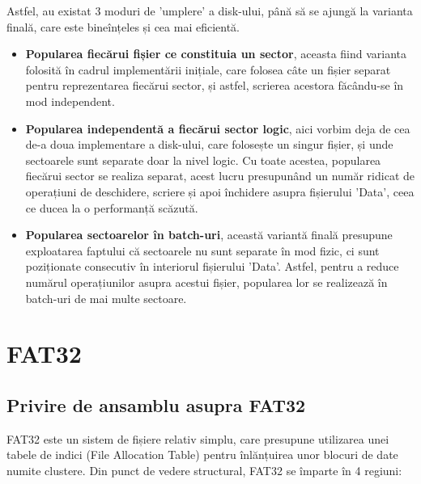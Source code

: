 Astfel, au existat 3 moduri de 'umplere' a disk-ului, până să se ajungă la varianta finală, care este bineînțeles și cea mai eficientă.

\begin{itemize}
  \item \textbf{Popularea fiecărui fișier ce constituia un sector}, aceasta fiind varianta folosită în cadrul implementării inițiale, care folosea câte un fișier separat pentru reprezentarea fiecărui sector, și astfel, scrierea acestora făcându-se în mod independent.
  
  \item \textbf{Popularea independentă a fiecărui sector logic}, aici vorbim deja de cea de-a doua implementare a disk-ului, care folosește un singur fișier, și unde sectoarele sunt separate doar la nivel logic. Cu toate acestea, popularea fiecărui sector se realiza separat, acest lucru presupunând un număr ridicat de operațiuni de deschidere, scriere și apoi închidere asupra fișierului 'Data', ceea ce ducea la o performanță scăzută.
  
  \item \textbf{Popularea sectoarelor în batch-uri}, această variantă finală presupune exploatarea faptului că sectoarele nu sunt separate în mod fizic, ci sunt poziționate consecutiv în interiorul fișierului 'Data'. Astfel, pentru a reduce numărul operațiunilor asupra acestui fișier, popularea lor se realizează în batch-uri de mai multe sectoare.
  
\end{itemize}



















\newpage

\section{FAT32}

\subsection{Privire de ansamblu asupra FAT32}

FAT32 este un sistem de fișiere relativ simplu, care presupune utilizarea unei tabele de indici (File Allocation Table) pentru înlănțuirea unor blocuri de date numite clustere. Din punct de vedere structural, FAT32 se împarte în 4 regiuni:


